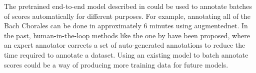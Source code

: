 
The pretrained end-to-end model described in
 could be used to annotate
batches of scores automatically for different purposes. For
example, annotating all of the Bach
Chorales
can be done in approximately 6 minutes using
\gls{augmentednet}. In the past, human-in-the-loop methods
like the one by \textcite{ju2019interactive} have been
proposed, where an expert annotator corrects a set of
auto-generated annotations to reduce the time required to
annotate a dataset. Using an existing model to batch
annotate scores could be a way of producing more training
data for future models.
